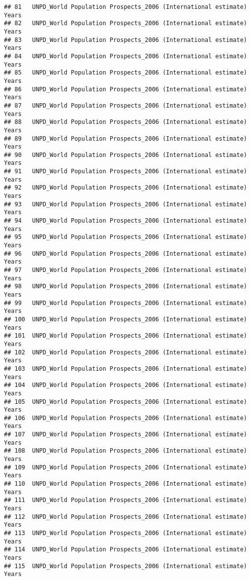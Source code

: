 \documentclass[]{article}
\begin{document}
\begin{verbatim}
## 81   UNPD_World Population Prospects_2006 (International estimate) Years
## 82   UNPD_World Population Prospects_2006 (International estimate) Years
## 83   UNPD_World Population Prospects_2006 (International estimate) Years
## 84   UNPD_World Population Prospects_2006 (International estimate) Years
## 85   UNPD_World Population Prospects_2006 (International estimate) Years
## 86   UNPD_World Population Prospects_2006 (International estimate) Years
## 87   UNPD_World Population Prospects_2006 (International estimate) Years
## 88   UNPD_World Population Prospects_2006 (International estimate) Years
## 89   UNPD_World Population Prospects_2006 (International estimate) Years
## 90   UNPD_World Population Prospects_2006 (International estimate) Years
## 91   UNPD_World Population Prospects_2006 (International estimate) Years
## 92   UNPD_World Population Prospects_2006 (International estimate) Years
## 93   UNPD_World Population Prospects_2006 (International estimate) Years
## 94   UNPD_World Population Prospects_2006 (International estimate) Years
## 95   UNPD_World Population Prospects_2006 (International estimate) Years
## 96   UNPD_World Population Prospects_2006 (International estimate) Years
## 97   UNPD_World Population Prospects_2006 (International estimate) Years
## 98   UNPD_World Population Prospects_2006 (International estimate) Years
## 99   UNPD_World Population Prospects_2006 (International estimate) Years
## 100  UNPD_World Population Prospects_2006 (International estimate) Years
## 101  UNPD_World Population Prospects_2006 (International estimate) Years
## 102  UNPD_World Population Prospects_2006 (International estimate) Years
## 103  UNPD_World Population Prospects_2006 (International estimate) Years
## 104  UNPD_World Population Prospects_2006 (International estimate) Years
## 105  UNPD_World Population Prospects_2006 (International estimate) Years
## 106  UNPD_World Population Prospects_2006 (International estimate) Years
## 107  UNPD_World Population Prospects_2006 (International estimate) Years
## 108  UNPD_World Population Prospects_2006 (International estimate) Years
## 109  UNPD_World Population Prospects_2006 (International estimate) Years
## 110  UNPD_World Population Prospects_2006 (International estimate) Years
## 111  UNPD_World Population Prospects_2006 (International estimate) Years
## 112  UNPD_World Population Prospects_2006 (International estimate) Years
## 113  UNPD_World Population Prospects_2006 (International estimate) Years
## 114  UNPD_World Population Prospects_2006 (International estimate) Years
## 115  UNPD_World Population Prospects_2006 (International estimate) Years

\end{verbatim}
\end{document}
